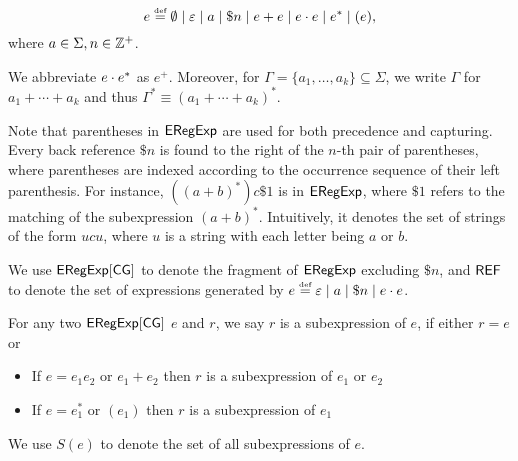 \begin{definition}
  	\[e \eqdef \emptyset \mid \varepsilon \mid a \mid \$n \mid e + e \mid e \concat e \mid e^* \mid (e)  , \]
  	where $a \in \Sigma, n \in \mathbb{Z}^+$. 
\end{definition}
We abbreviate $e \cdot e^*$ as $e^+$. Moreover, for $\Gamma = \{a_1, \ldots, a_k\}\subseteq \Sigma$, we write $\Gamma$ for  $a_1 + \cdots + a_k$ and thus  $\Gamma^\ast \equiv (a_1 + \cdots + a_k)^\ast$. 

Note that parentheses in ${\sf ERegExp}$ are used for both precedence and capturing. 
%
Every back reference $\$ n$ is found to the right of the $n$-th pair of parentheses, where parentheses
are indexed according to the occurrence sequence of their left parenthesis. For instance, $((a+b)^*) c \$1$ is in ${\sf ERegExp}$, where $\$1$ refers to the matching of the subexpression $(a+b)^*$. Intuitively, it denotes the set of strings of the form $u c u$, where $u$ is a string with each letter being $a$ or $b$.
  
We use ${\sf ERegExp}[\sf CG]$ to denote the fragment of ${\sf ERegExp}$  excluding $\$ n$, and ${\sf REF}$ to denote the set of expressions generated by $e \eqdef \varepsilon \mid a \mid \$n \mid e \concat e$.
  
  
  
  
  
  \begin{definition}[Subexpression]
  	For any two ${\sf ERegExp}[\sf CG]$ $e$ and $r$, we say $r$ is a subexpression of $e$,
  	if either $r=e$ or
  	\begin{itemize}
  		\item If $e = e_1 e_2$ or $e_1 + e_2$ then $r$ is a subexpression of $e_1$
  		or $e_2$
  		
  		\item If $e = e_1^{\ast}$ or $(e_1)$ then $r$ is a subexpression of $e_1$
  	\end{itemize}
  	We use $S (e)$ to denote the set of all subexpressions of $e$.
  \end{definition}

